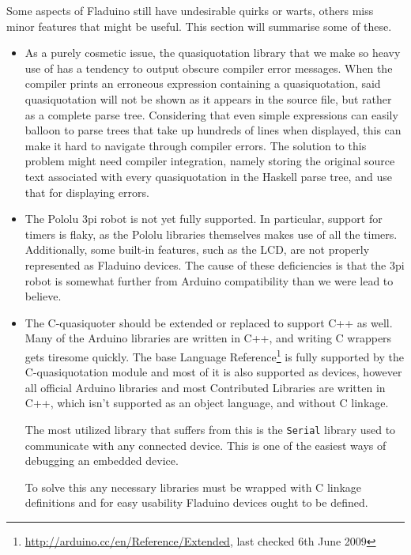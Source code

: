 \documentclass[a4paper, oneside, final]{memoir}
\begin{document}
Some aspects of Fladuino still have undesirable quirks or warts,
others miss minor features that might be useful.  This section will
summarise some of these.

\begin{itemize}
\item As a purely cosmetic issue, the quasiquotation library that we
  make so heavy use of has a tendency to output obscure compiler error
  messages.  When the compiler prints an erroneous expression
  containing a quasiquotation, said quasiquotation will not be shown
  as it appears in the source file, but rather as a complete parse
  tree.  Considering that even simple expressions can easily balloon
  to parse trees that take up hundreds of lines when displayed, this
  can make it hard to navigate through compiler errors.  The solution
  to this problem might need compiler integration, namely storing the
  original source text associated with every quasiquotation in the
  Haskell parse tree, and use that for displaying errors.
\item The Pololu 3pi robot is not yet fully supported.  In particular,
  support for timers is flaky, as the Pololu libraries themselves
  makes use of all the timers.  Additionally, some built-in features, such
  as the LCD, are not properly represented as Fladuino devices.  The
  cause of these deficiencies is that the 3pi robot is somewhat
  further from Arduino compatibility than we were lead to believe.
\item The C-quasiquoter should be extended or replaced to support C++
  as well.  Many of the Arduino libraries are written in C++, and
  writing C wrappers gets tiresome quickly.  The base Language
  Reference\footnote{\url{http://arduino.cc/en/Reference/Extended},
    last checked 6th June 2009} is fully supported by the
  C-quasiquotation module and most of it is also supported as devices,
  however all official Arduino libraries and most Contributed
  Libraries are written in C++, which isn't supported as an object
  language, and without C linkage.

  The most utilized library that suffers from this is the \texttt{Serial}
  library used to communicate with any connected device. This is one
  of the easiest ways of debugging an embedded device.

  To solve this any necessary libraries must be wrapped with C linkage
  definitions and for easy usability Fladuino devices ought to be
  defined.
\end{itemize}
\end{document}

